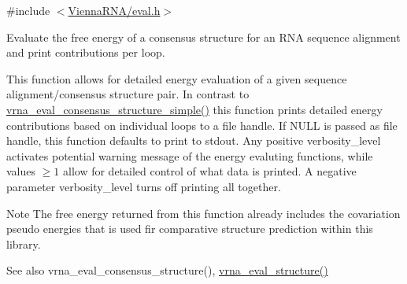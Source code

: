 {\ttfamily \#include $<$\mbox{\hyperlink{eval_8h}{Vienna\+R\+N\+A/eval.\+h}}$>$}



Evaluate the free energy of a consensus structure for an R\+NA sequence alignment and print contributions per loop. 

This function allows for detailed energy evaluation of a given sequence alignment/consensus structure pair. In contrast to \mbox{\hyperlink{group__eval_ga7762c3a7bdcbc3a14ef93259d322c7d6}{vrna\+\_\+eval\+\_\+consensus\+\_\+structure\+\_\+simple()}} this function prints detailed energy contributions based on individual loops to a file handle. If N\+U\+LL is passed as file handle, this function defaults to print to stdout. Any positive {\ttfamily verbosity\+\_\+level} activates potential warning message of the energy evaluting functions, while values $ \ge 1 $ allow for detailed control of what data is printed. A negative parameter {\ttfamily verbosity\+\_\+level} turns off printing all together.

\begin{DoxyNote}{Note}
The free energy returned from this function already includes the covariation pseudo energies that is used fir comparative structure prediction within this library.
\end{DoxyNote}
\begin{DoxySeeAlso}{See also}
vrna\+\_\+eval\+\_\+consensus\+\_\+structure(), \mbox{\hyperlink{group__eval_ga58f199f1438d794a265f3b27fc8ea631}{vrna\+\_\+eval\+\_\+structure()}}
\end{DoxySeeAlso}


